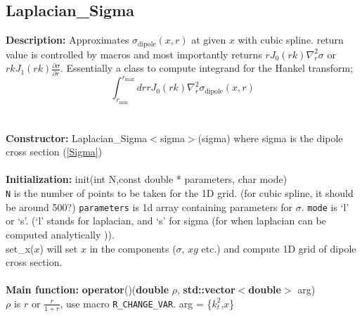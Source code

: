 \documentclass[12pt]{article}
\newenvironment{entry}[1]{\textbf{\large #1:  }}{\\\vspace{3mm}\\}
\begin{document}
\subsection{Laplacian\_Sigma}\label{LaplacianSigma}
\begin{entry}{Description}
	Approximates $\sigma_{\mathrm{dipole}}(x,r)$ at given $x$ with cubic spline. 
	return value is controlled by macros and most importantly returns $rJ_0(rk)\nabla^2_r \sigma$ or $rkJ_1(rk)\frac{\partial \sigma}{\partial r}$.
	Essentially a class to compute integrand for the Hankel transform;
	\begin{equation}
		\int^{r_{\mathrm{max}}}_{r_{\mathrm{min}}} dr r J_0(rk)\nabla^2_{r}\sigma_{\mathrm{dipole}}(x,r)
	\end{equation}
\end{entry}
\begin{entry}{Constructor}
	Laplacian\_Sigma$<$sigma$>$(sigma)
	where sigma is the dipole cross section (\ref{Sigma})
\end{entry}
\begin{entry}{Initialization}
	init(int N,const double * parameters, char mode)\\
	\texttt{N} is the number of points to be taken for the 1D grid. (for cubic spline, it should be around 500?)
	\texttt{parameters} is 1d array containing parameters for $\sigma$. \texttt{mode} is `l' or `s'.  (`l' stands for laplacian, and `s' for sigma (for when laplacian can be computed analytically )). \\
	set\_x($x$) will set $x$ in the components ($\sigma$, $xg$ etc.) and compute 1D grid of dipole cross section.
\end{entry}
\begin{entry}{Main function}
	\textbf{operator}()(\textbf{double} $\rho$, \textbf{std::vector$<$double$>$} arg)\\
	$\rho$ is $r$ or $\frac{r}{1+r}$, use macro \texttt{R\_CHANGE\_VAR}.
	arg = \{$k_t^2$,$x$\} 
\end{entry}
\end{document}
